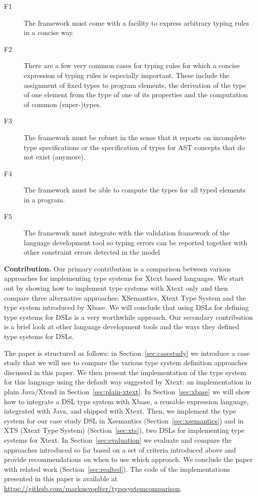 \begin{description}
  \item[F1] The framework must come with a facility to express arbitrary typing
  rules in a concise way. 
  \item[F2] There are a few very common cases for typing rules for which a
  concise expression of typing rules is especially important. These include the 
  assignment of fixed types to program elements, the derivation of the type of one 
  element from the type of one of its properties and the computation of common (super-)types.
  \item[F3] The framework must be robust in the sense that it reports on
  incomplete type specifications or the specification of types for AST concepts
  that do not exist (anymore).
  \item[F4] The framework must be able to compute the types for all typed
  elements in a program. 
  \item[F5]  The framework must integrate with the validation framework of the
  language development tool so typing errors can be reported together with other
  constraint errors detected in the model
\end{description}


\textbf{Contribution.} Our primary contribution is a comparison between various
approaches for implementing type systems for Xtext based languages. We start out
by showing how to implement type systems with Xtext only and then compare three
alternative approaches: XSemantics, Xtext Type System and the type system introduced 
by Xbase. We will conclude that using DSLs for defining type systems for DSLs is
a very worthwhile approach. Our secondary contribution is a brief look
at other language development tools and the ways they defined type systems for
DSLs.

The paper is structured as follows: in Section~\ref{sec:casestudy} we
introduce a case study that we will use to compare the various type system definition approaches discussed in this paper.
We then
present the implementation of the type system for this language using the
default way suggested by Xtext: an implementation in plain Java/Xtend 
in Section~\ref{sec:plain-xtext}. In Section~\ref{sec:xbase} we will show how to
integrate a DSL type system with Xbase, a reusable expression language, integrated
with Java, and shipped with Xtext. Then, we implement
the type system for our case study DSL in Xsemantics (Section~\ref{sec:xsemantics}) and 
in XTS (Xtext Type System) (Section~\ref{sec:xts}), two DSLs for implementing
type systems for Xtext. In Section~\ref{sec:evaluation} we evaluate and compare
the approaches introduced so far based on a set of criteria introduced above and
provide recommendations on when to use which approach.  We conclude the paper
with related work (Section~\ref{sec:realted}).
The
code of the implementations presented in this paper is available at \\
\url{https://github.com/markusvoelter/typesystemcomparison}.


